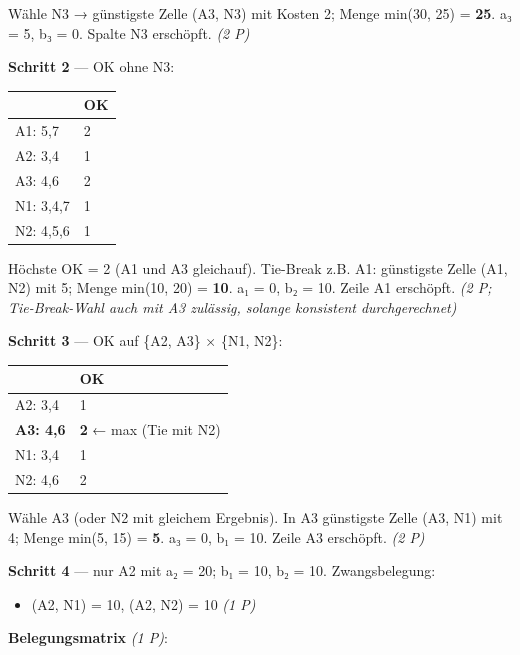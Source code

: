 \documentclass[11pt, a4paper]{article}
\begin{document}
Wähle N3 → günstigste Zelle (A3, N3) mit Kosten 2; Menge min(30, 25) = \textbf{25}. a₃ = 5, b₃ = 0. Spalte N3 erschöpft. \textit{(2 P)}


\textbf{Schritt 2} — OK ohne N3:



{\small
\begin{tabularx}{\linewidth}{XX}
\hline
\rowcolor{tableheadbg}
{\color{white}\textbf{}} & {\color{white}\textbf{OK}} \\[2pt]
\hline
\endhead
\hline
\endfoot
A1: 5,7 & 2 \\
A2: 3,4 & 1 \\
A3: 4,6 & 2 \\
N1: 3,4,7 & 1 \\
N2: 4,5,6 & 1 \\
\end{tabularx}
}


Höchste OK = 2 (A1 und A3 gleichauf). Tie-Break z.B. A1: günstigste Zelle (A1, N2) mit 5; Menge min(10, 20) = \textbf{10}. a₁ = 0, b₂ = 10. Zeile A1 erschöpft. \textit{(2 P; Tie-Break-Wahl auch mit A3 zulässig, solange konsistent durchgerechnet)}


\textbf{Schritt 3} — OK auf \{A2, A3\} × \{N1, N2\}:



{\small
\begin{tabularx}{\linewidth}{XX}
\hline
\rowcolor{tableheadbg}
{\color{white}\textbf{}} & {\color{white}\textbf{OK}} \\[2pt]
\hline
\endhead
\hline
\endfoot
A2: 3,4 & 1 \\
\textbf{A3: 4,6} & \textbf{2} ← max (Tie mit N2) \\
N1: 3,4 & 1 \\
N2: 4,6 & 2 \\
\end{tabularx}
}


Wähle A3 (oder N2 mit gleichem Ergebnis). In A3 günstigste Zelle (A3, N1) mit 4; Menge min(5, 15) = \textbf{5}. a₃ = 0, b₁ = 10. Zeile A3 erschöpft. \textit{(2 P)}


\textbf{Schritt 4} — nur A2 mit a₂ = 20; b₁ = 10, b₂ = 10. Zwangsbelegung:

\begin{itemize}
  \item (A2, N1) = 10, (A2, N2) = 10 \textit{(1 P)}
\end{itemize}

\textbf{Belegungsmatrix} \textit{(1 P)}:
\end{document}
